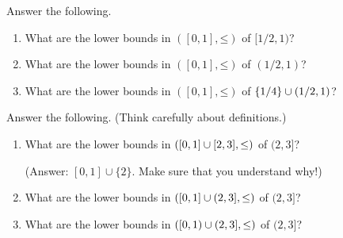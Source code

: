 \begin{exercise}
	\label{exercise:lb-R}
	Answer the following.
	
	\begin{enumerate}[label=(\alph*)]

		\item What are the lower bounds in $([0,1],\mathord{\leq})$ of $[1/2,1)$?

		\item What are the lower bounds in $([0,1],\mathord{\leq})$ of $(1/2,1)$?
	
		\item \label{item:lb_R_notsub} What are the lower bounds in $([0,1],\mathord{\leq})$ of $\{1/4\} \cup (1/2,1)$?
	
	\end{enumerate}
\end{exercise}

\begin{exercise}
	\label{exercise:lb_disj}
	Answer the following. (Think carefully about definitions.)
	
	\begin{enumerate}[label=(\alph*)]
	
		\item What are the lower bounds in $([0,1] \cup [2,3],\mathord{\leq})$ of $(2,3]$?

		(Answer: $[0,1] \cup \{2\}$. Make sure that you understand why!)

		\item What are the lower bounds in $([0,1] \cup (2,3],\mathord{\leq})$ of $(2,3]$?

		\item What are the lower bounds in $([0,1) \cup (2,3],\mathord{\leq})$ of $(2,3]$?
	
	\end{enumerate}
\end{exercise}

